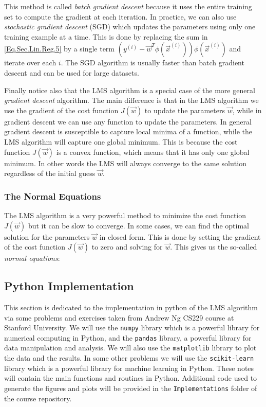 \begin{remark}
	This method is called \emph{batch gradient descent} because it uses the entire training set to compute the gradient at each iteration. In practice, we can also use \emph{stochastic gradient descent} (SGD) which updates the parameters using only one training example at a time. This is done by replacing the sum in \cref{Eq.Sec.Lin.Reg.5} by a single term $(y^{(i)} - \vec{w}^T\phi(\vec{x}^{(i)}))\phi(\vec{x}^{(i)})$ and iterate over each $i$. The SGD algorithm is usually faster than batch gradient descent and can be used for large datasets. 
\end{remark}

Finally notice also that the LMS algorithm is a special case of the more general \emph{gradient descent} algorithm. The main difference is that in the LMS algorithm we use the gradient of the cost function $J(\vec{w})$ to update the parameters $\vec{w}$, while in gradient descent we can use any function to update the parameters. In general gradient descent is susceptible to capture local minima of a function, while the LMS algorithm will capture one global minimum. This is because the cost function $J(\vec{w})$ is a convex function, which means that it has only one global minimum. In other words the LMS will always converge to the same solution regardless of the initial guess $\vec{w}$. 

\subsubsection{The Normal Equations}
The LMS algorithm is a very powerful method to minimize the cost function $J(\vec{w})$ but it can be slow to converge. In some cases, we can find the optimal solution for the parameters $\vec{w}$ in closed form. This is done by setting the gradient of the cost function $J(\vec{w})$ to zero and solving for $\vec{w}$. This gives us the so-called \emph{normal equations}:


\subsection{Python Implementation}

This section is dedicated to the implementation in python of the LMS algorithm via some problems and exercises taken from Andrew Ng CS229 course at Stanford University. We will use the \texttt{numpy} library which is a powerful library for numerical computing in Python, and the \texttt{pandas} library, a powerful library for data manipulation and analysis. We will also use the \texttt{matplotlib} library to plot the data and the results. In some other problems we will use the \texttt{scikit-learn} library which is a powerful library for machine learning in Python. These notes will contain the main functions and routines in Python. Additional code used to generate the figures and plots will be provided in the \faFolderOpen \texttt{Implementations} folder of the course repository. 

